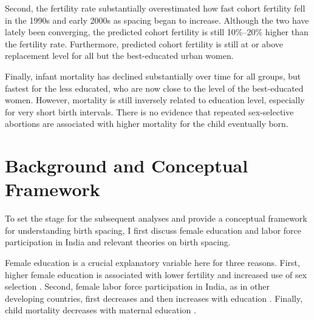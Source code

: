 \documentclass[12pt,letterpaper]{article}
\begin{document}
Second, the fertility rate substantially overestimated how fast cohort fertility fell in the 
1990s and early 2000s as spacing began to increase. 
Although the two have lately been converging, the predicted cohort fertility is still 
10\%--20\% higher than the fertility rate. 
Furthermore, predicted cohort fertility is still at or above replacement level for all but 
the best-educated urban women. 

Finally, infant mortality has declined substantially over time for all groups, but fastest 
for the less educated, who are now close to the level of the best-educated women. 
However, mortality is still inversely related to education level, especially for very short 
birth intervals. 
There is no evidence that repeated sex-selective abortions are associated with higher 
mortality for the child eventually born.



\section{Background and Conceptual Framework}

To set the stage for the subsequent analyses and provide a conceptual framework for 
understanding birth spacing, I first discuss female education and labor force 
participation in India and relevant theories on birth spacing.


Female education is a crucial explanatory variable here for three reasons.
First, higher female education is associated with lower fertility and increased use of 
sex selection
\citep{das_gupta97,dreze01,bhat03,retherford03b,Guilmoto2009a,Portner2015b,Jayachandran2017}.
Second, female labor force participation in India, as in other developing countries, 
first decreases and then increases with education
\citep{Klasen2015,Fletcher2017,Afridi2018,Bhargava2018,Chatterjee2018,Bhargava2019}.
Finally, child mortality decreases with maternal education
\citep{Rosenzweig1982a,Whitworth2002,Maitra2008}.

\end{document}
